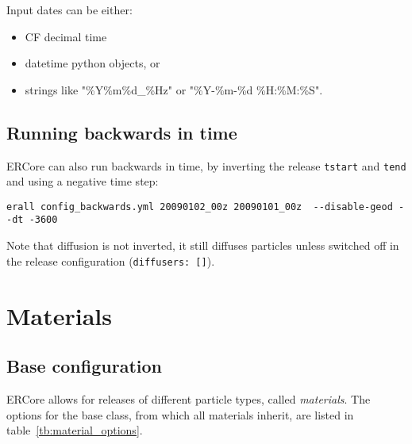 \documentclass[a4paper]{article}
\begin{document}
Input dates can be either:

\begin{itemize} 
\item CF decimal time
\item datetime python objects, or 
\item strings like "\%Y\%m\%d\_\%Hz" or "\%Y-\%m-\%d \%H:\%M:\%S".
\end{itemize} 

\subsection{Running backwards in time}
\label{ssec:backwards}

ERCore can also run backwards in time, by inverting the release \texttt{tstart} and \texttt{tend} and using a negative time step:

\begin{Verbatim}[fontsize=\small]
erall config_backwards.yml 20090102_00z 20090101_00z  --disable-geod --dt -3600
\end{Verbatim}

Note that diffusion is not inverted, it still diffuses particles unless switched off in the release configuration (\texttt{diffusers: []}).

\section{Materials}
\label{sec:materials}
\subsection{Base configuration}
\label{ssec:base}

ERCore allows for releases of different particle types, called \textit{materials}. The options for the base class, from which all materials inherit, are listed in table~\ref{tb:material_options}. 
\end{document}
